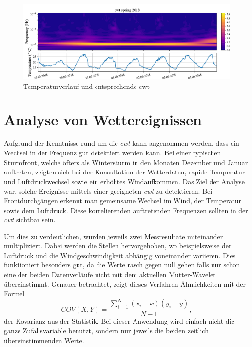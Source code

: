 \begin{refsection}
\begin{figure}[b]
	\centering
	\includegraphics[width=1\textwidth]{papers/wwt/images/data_spring.pdf}
	\caption{Temperaturverlauf und entsprechende cwt}
	\label{fig:cwt_zoom}
\end{figure}



\section{Analyse von Wettereignissen}
Aufgrund der Kenntnisse rund um die \textit{cwt} kann angenommen werden, dass ein Wechsel in der Frequenz gut detektiert werden kann.
Bei einer typischen Sturmfront, welche öfters als Wintersturm in den Monaten Dezember und Januar auftreten, zeigten sich bei der Konsultation der Wetterdaten, rapide Temperatur- und Luftdruckwechsel sowie ein erhöhtes Windaufkommen.
Das Ziel der Analyse war, solche Ereignisse mittels einer geeigneten \textit{cwt} zu detektieren.
Bei Frontdurchgängen erkennt man gemeinsame Wechsel im Wind, der Temperatur sowie dem Luftdruck.
Diese korrelierenden auftretenden Frequenzen sollten in der \textit{cwt} sichtbar sein.

Um dies zu verdeutlichen, wurden jeweils zwei Messresultate miteinander multipliziert. 
Dabei werden die Stellen hervorgehoben, wo beispielsweise der Luftdruck und die Windgeschwindigkeit abhängig voneinander variieren.  
Dies funktioniert besonders gut, da die Werte rasch gegen null gehen falls nur schon eine der beiden Datenverläufe nicht mit dem aktuellen Mutter-Wavelet übereinstimmt.
Genauer betrachtet, zeigt dieses Verfahren Ähnlichkeiten mit der Formel
\begin{equation}
COV(X,Y) = \frac{\sum_{i=1}^{N} (x_i- \bar{x})(y_i- \bar{y})}{N-1},
\end{equation}
der Kovarianz aus der Statistik. Bei dieser Anwendung wird einfach nicht die ganze Zufallsvariable benutzt, sondern nur jeweils die beiden zeitlich übereinstimmenden Werte.


\end{refsection}
